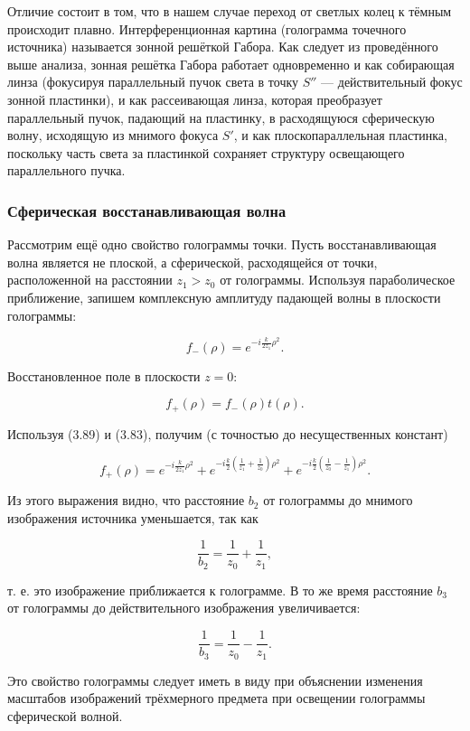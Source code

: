 \documentclass[a4paper,12pt]{article}
\begin{document}
Отличие состоит в том, что в нашем случае переход от светлых колец к тёмным происходит плавно. Интерференционная картина (голограмма точечного источника) называется зонной решёткой Габора. Как следует из проведённого выше анализа, зонная решётка Габора работает одновременно и как собирающая линза (фокусируя параллельный пучок света в точку \( S'' \) — действительный фокус зонной пластинки), и как рассеивающая линза, которая преобразует параллельный пучок, падающий на пластинку, в расходящуюся сферическую волну, исходящую из мнимого фокуса \( S' \), и как плоскопараллельная пластинка, поскольку часть света за пластинкой сохраняет структуру освещающего параллельного пучка.

\subsubsection{Сферическая восстанавливающая волна}

Рассмотрим ещё одно свойство голограммы точки. Пусть восстанавливающая волна является не плоской, а сферической, расходящейся от точки, расположенной на расстоянии \( z_1 > z_0 \) от голограммы. Используя параболическое приближение, запишем комплексную амплитуду падающей волны в плоскости голограммы:

\[ f_-(\rho) = e^{-i \frac{k}{2z_1} \rho^2}. \]

Восстановленное поле в плоскости \( z = 0 \):

\[ f_+(\rho) = f_-(\rho) t(\rho). \]

Используя (3.89) и (3.83), получим (с точностью до несущественных констант)

\[ f_+(\rho) = e^{-i \frac{k}{2z_1} \rho^2} + e^{-i \frac{k}{2} \left( \frac{1}{z_1} + \frac{1}{z_0} \right) \rho^2} + e^{-i \frac{k}{2} \left( \frac{1}{z_0} - \frac{1}{z_1} \right) \rho^2}. \]

Из этого выражения видно, что расстояние \( b_2 \) от голограммы до мнимого изображения источника уменьшается, так как

\[ \frac{1}{b_2} = \frac{1}{z_0} + \frac{1}{z_1}, \]

т. е. это изображение приближается к голограмме. В то же время расстояние \( b_3 \) от голограммы до действительного изображения увеличивается:

\[ \frac{1}{b_3} = \frac{1}{z_0} - \frac{1}{z_1}. \]

Это свойство голограммы следует иметь в виду при объяснении изменения масштабов изображений трёхмерного предмета при освещении голограммы сферической волной.
\end{document}
